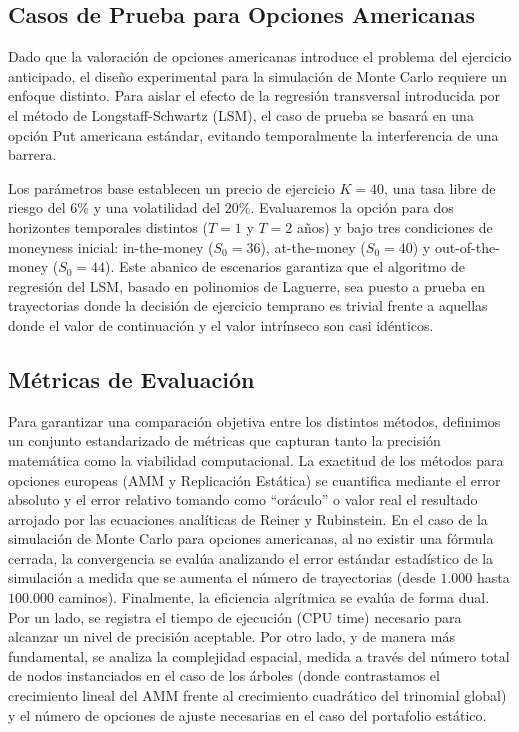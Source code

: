 \subsection{Casos de Prueba para Opciones Americanas}

Dado que la valoración de opciones americanas introduce el problema del ejercicio anticipado, el diseño experimental para la simulación de Monte Carlo requiere un enfoque distinto. Para aislar el efecto de la regresión transversal introducida por el método de Longstaff-Schwartz (LSM), el caso de prueba se basará en una opción Put americana estándar, evitando temporalmente la interferencia de una barrera.

Los parámetros base establecen un precio de ejercicio $K=40$, una tasa libre de riesgo del $6\%$ y una volatilidad del $20\%$. Evaluaremos la opción para dos horizontes temporales distintos ($T=1$ y $T=2$ años) y bajo tres condiciones de moneyness inicial: in-the-money ($S_0=36$), at-the-money ($S_0=40$) y out-of-the-money ($S_0=44$). Este abanico de escenarios garantiza que el algoritmo de regresión del LSM, basado en polinomios de Laguerre, sea puesto a prueba en trayectorias donde la decisión de ejercicio temprano es trivial frente a aquellas donde el valor de continuación y el valor intrínseco son casi idénticos.

\subsection{Métricas de Evaluación}

Para garantizar una comparación objetiva entre los distintos métodos, definimos un conjunto estandarizado de métricas que capturan tanto la precisión matemática como la viabilidad computacional.
La exactitud de los métodos para opciones europeas (AMM y Replicación Estática) se cuantifica mediante el error absoluto y el error relativo tomando como ``oráculo'' o valor real el resultado arrojado por las ecuaciones analíticas de Reiner y Rubinstein. En el caso de la simulación de Monte Carlo para opciones americanas, al no existir una fórmula cerrada, la convergencia se evalúa analizando el error estándar estadístico de la simulación a medida que se aumenta el número de trayectorias (desde $1.000$ hasta $100.000$ caminos).
Finalmente, la eficiencia algrítmica se evalúa de forma dual. Por un lado, se registra el tiempo de ejecución (CPU time) necesario para alcanzar un nivel de precisión aceptable. Por otro lado, y de manera más fundamental, se analiza la complejidad espacial, medida a través del número total de nodos instanciados en el caso de los árboles (donde contrastamos el crecimiento lineal del AMM frente al crecimiento cuadrático del trinomial global) y el número de opciones de ajuste necesarias en el caso del portafolio estático.

